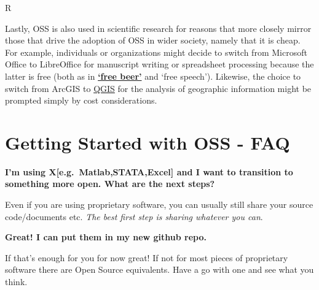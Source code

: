 \documentclass[]{book}
\begin{document}
R

Lastly, OSS is also used in scientific research for reasons that more closely mirror those that drive the adoption of OSS in wider society, namely that it is cheap. For example, individuals or organizations might decide to switch from Microsoft Office to LibreOffice for manuscript writing or spreadsheet processing because the latter is free (both as in \href{https://www.youtube.com/watch?v=dQw4w9WgXcQ}{\textbf{`free beer'}} and `free speech'). Likewise, the choice to switch from ArcGIS to \href{https://www.qgis.org/en/site/}{QGIS} for the analysis of geographic information might be prompted simply by cost considerations.

\hypertarget{getting-started-with-oss---faq}{%
\section{Getting Started with OSS - FAQ }\label{getting-started-with-oss---faq}}

\textbf{I'm using X{[}e.g.~Matlab,STATA,Excel{]} and I want to transition to something more open. What are the next steps?}

Even if you are using proprietary software, you can usually still share your source code/documents etc. \emph{The best first step is sharing whatever you can}.

\textbf{Great! I can put them in my new github repo.}

If that's enough for you for now great! If not for most pieces of proprietary software there are Open Source equivalents. Have a go with one and see what you think.
\end{document}
